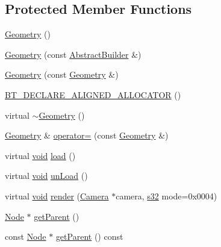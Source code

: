 \subsection*{Protected Member Functions}
\begin{DoxyCompactItemize}
\item 
\mbox{\hyperlink{classnjli_1_1_geometry_aa4130386ba85c7f15437fc3539530cc2}{Geometry}} ()
\item 
\mbox{\hyperlink{classnjli_1_1_geometry_af78c87969f709e52b767f1f1841e6b51}{Geometry}} (const \mbox{\hyperlink{classnjli_1_1_abstract_builder}{Abstract\+Builder}} \&)
\item 
\mbox{\hyperlink{classnjli_1_1_geometry_a11bccbb5b7f74ffe5e85afe825069120}{Geometry}} (const \mbox{\hyperlink{classnjli_1_1_geometry}{Geometry}} \&)
\item 
\mbox{\hyperlink{classnjli_1_1_geometry_a91ea8d7cf64ab6c3b07d370a64d69f73}{B\+T\+\_\+\+D\+E\+C\+L\+A\+R\+E\+\_\+\+A\+L\+I\+G\+N\+E\+D\+\_\+\+A\+L\+L\+O\+C\+A\+T\+OR}} ()
\item 
virtual \mbox{\hyperlink{classnjli_1_1_geometry_aa2b91ed0f6436f990deeef380ef7843e}{$\sim$\+Geometry}} ()
\item 
\mbox{\hyperlink{classnjli_1_1_geometry}{Geometry}} \& \mbox{\hyperlink{classnjli_1_1_geometry_a191cc8461636a801bce0f2bf8f1992f6}{operator=}} (const \mbox{\hyperlink{classnjli_1_1_geometry}{Geometry}} \&)
\item 
virtual \mbox{\hyperlink{_thread_8h_af1e856da2e658414cb2456cb6f7ebc66}{void}} \mbox{\hyperlink{classnjli_1_1_geometry_a61477b1983dc37e146232b99eff643e1}{load}} ()
\item 
virtual \mbox{\hyperlink{_thread_8h_af1e856da2e658414cb2456cb6f7ebc66}{void}} \mbox{\hyperlink{classnjli_1_1_geometry_a0c5960113b3cd040e7df7b8d2104f7a3}{un\+Load}} ()
\item 
virtual \mbox{\hyperlink{_thread_8h_af1e856da2e658414cb2456cb6f7ebc66}{void}} \mbox{\hyperlink{classnjli_1_1_geometry_ab2f41460700ad44f8cea15d6e8b66fea}{render}} (\mbox{\hyperlink{classnjli_1_1_camera}{Camera}} $\ast$camera, \mbox{\hyperlink{_util_8h_aa62c75d314a0d1f37f79c4b73b2292e2}{s32}} mode=0x0004)
\item 
\mbox{\hyperlink{classnjli_1_1_node}{Node}} $\ast$ \mbox{\hyperlink{classnjli_1_1_geometry_a6547f3d712e0507d79e47b162360eab0}{get\+Parent}} ()
\item 
const \mbox{\hyperlink{classnjli_1_1_node}{Node}} $\ast$ \mbox{\hyperlink{classnjli_1_1_geometry_aeda5f906f9221ce62149bc959d3460b2}{get\+Parent}} () const

\end{DoxyCompactItemize}
